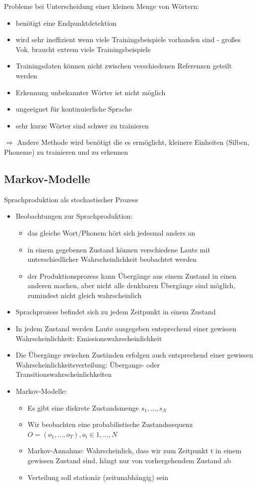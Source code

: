 \documentclass[a4paper,10pt,oneside]{article}
\begin{document}
\vspace{5px}
\flushleft Probleme bei Unterscheidung einer kleinen Menge von Wörtern:
		\begin{itemize}
			\item benötigt eine Endpunktdetektion
			\item wird sehr ineffizient wenn viele Trainingsbeispiele vorhanden sind - großes Vok. braucht extrem viele Trainingsbeispiele
			\item Trainingsdaten können nicht zwischen verschiedenen Referenzen geteilt werden
			\item Erkennung unbekannter Wörter ist nicht möglich
			\item ungeeignet für kontinuierliche Sprache
			\item sehr kurze Wörter sind schwer zu trainieren
		\end{itemize}
	$\Rightarrow$ Andere Methode wird benötigt die es ermöglicht, kleinere Einheiten (Silben, Phoneme) zu trainieren und zu erkennen 		

\subsection{Markov-Modelle}
Sprachproduktion als stochastischer Prozess
	\begin{itemize}
		\item Beobachtungen zur Sprachproduktion:
		\begin{itemize}
			\item das gleiche Wort/Phonem hört sich jedesmal anders an
			\item in einem gegebenen Zustand können verschiedene Laute mit 		unterschiedlicher Wahrscheinlichkeit beobachtet werden
			\item der Produktionsprozess kann Übergänge aus einem Zustand in einen anderen machen, aber nicht alle denkbaren Übergänge sind möglich, zumindest nicht gleich wahrscheinlich
		\end{itemize}
		\item Sprachprozess befindet sich zu jedem Zeitpunkt in einem Zustand
		\item In jedem Zustand werden Laute ausgegeben entsprechend einer gewissen Wahrscheinlichkeit: Emissionswahrscheinlichkeit
		\item Die Übergänge zwischen Zuständen erfolgen auch entsprechend einer gewissen Wahrscheinlichkeitsverteilung: Übergangs- oder Transitionswahrscheinlichkeiten
		\item Markov-Modelle:
			\begin{itemize}
				\item Es gibt eine diskrete Zustandsmenge ${s_1, ... ,s_N}$
				\item Wir beobachten eine probabilistische Zustandssequenz $O = (o_1,...,o_T), o_i \in  {1,...,N}$
				\item Markov-Annahme: Wahrscheinlich, dass wir zum Zeitpunkt t in einem gewissen Zustand sind, hängt nur von vorhergehendem Zustand ab
				\item Verteilung soll stationär (zeitunabhängig) sein
			\end{itemize}
	\end{itemize}
	
\end{document}
